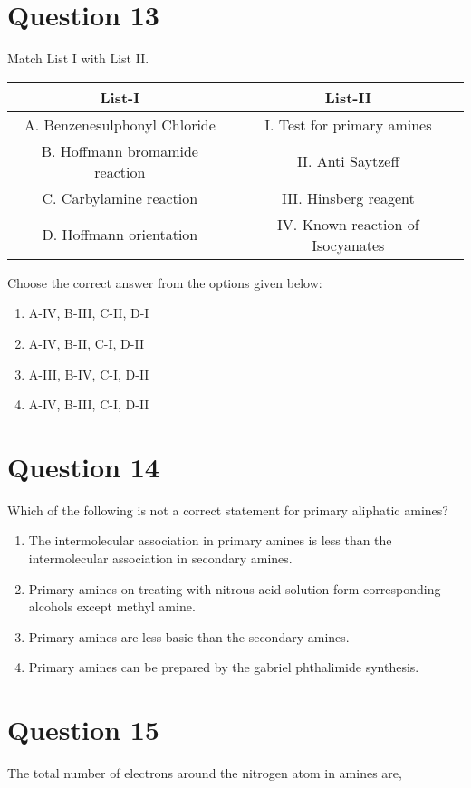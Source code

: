 \documentclass{article}
\begin{document}
\section*{Question 13}
Match List I with List II.\setlength{\arrayrulewidth}{0.8mm}
\begin{tabular}{|c|c|}
\hline
List-I & List-II \\
\hline
A. Benzenesulphonyl Chloride & I. Test for primary amines \\
\hline
B. Hoffmann bromamide reaction & II. Anti Saytzeff \\
\hline
C. Carbylamine reaction & III. Hinsberg reagent \\
\hline
D. Hoffmann orientation & IV. Known reaction of Isocyanates \\
\hline
\end{tabular}
\setlength{\arrayrulewidth}{0.4mm}
Choose the correct answer from the options given below: \newline
\begin{enumerate}[label=(\alph*)]
\item A-IV, B-III, C-II, D-I
\item A-IV, B-II, C-I, D-II
\item A-III, B-IV, C-I, D-II
\item A-IV, B-III, C-I, D-II
\end{enumerate}
\newpage
\section*{Question 14}
Which of the following is not a correct statement for primary aliphatic amines? 
\begin{enumerate}[label=(\alph*)]
\item The intermolecular association in primary amines is less than the intermolecular association in secondary amines.
\item Primary amines on treating with nitrous acid solution form corresponding alcohols except methyl amine.
\item Primary amines are less basic than the secondary amines.
\item Primary amines can be prepared by the gabriel phthalimide synthesis.
\end{enumerate}
\newpage
\section*{Question 15}
The total number of electrons around the nitrogen atom in amines are, 
\begin{enumerate}[label=(\alph*)]
\end{enumerate}
\newpage
\end{document}
